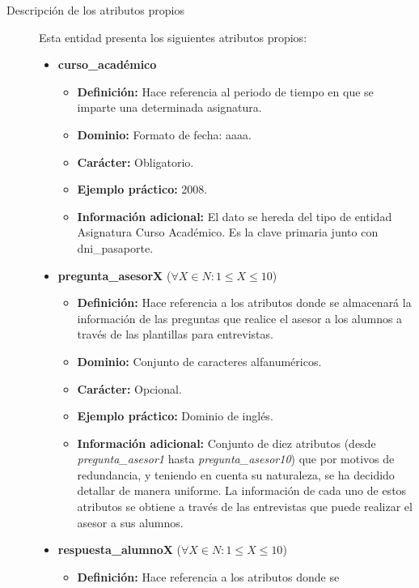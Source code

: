 \begin{description}
   \item[Descripción de los atributos propios] Esta entidad presenta los
   siguientes atributos propios:

   \begin{itemize}
   \item \textbf{curso\_académico}
      \begin{itemize}
         \item \textbf{Definición:} Hace referencia al periodo de tiempo en que se imparte una determinada asignatura.
         \item \textbf{Dominio:} Formato de fecha: aaaa.
         \item \textbf{Carácter:}  Obligatorio.
         \item \textbf{Ejemplo práctico:} 2008.
         \item \textbf{Información adicional:} El dato se hereda del tipo de entidad Asignatura Curso Académico. Es la clave primaria junto con dni\_pasaporte.
      \end{itemize}
   \item \textbf{pregunta\_asesorX} ($\forall X \in N : 1 \leq X \leq 10$)
      \begin{itemize}
         \item \textbf{Definición:} Hace referencia a los atributos donde se
         almacenará la información de las preguntas que realice el asesor
         a los alumnos a través de las plantillas para entrevistas.
         \item \textbf{Dominio:} Conjunto de caracteres alfanuméricos.
         \item \textbf{Carácter:}  Opcional.
         \item \textbf{Ejemplo práctico:} Dominio de inglés.
         \item \textbf{Información adicional:} Conjunto de diez atributos
         (desde \textit{pregunta\_asesor1} hasta \textit{pregunta\_asesor10})
         que por motivos de redundancia, y teniendo en cuenta su naturaleza, se
         ha decidido detallar de manera uniforme. La información de cada uno
         de estos atributos se obtiene a través de las entrevistas que puede
         realizar el asesor a sus alumnos.
      \end{itemize}
   \item \textbf{respuesta\_alumnoX} ($\forall X \in N : 1 \leq X \leq 10$)
      \begin{itemize}
         \item \textbf{Definición:} Hace referencia a los atributos donde se

\end{itemize}
\end{itemize}
\end{description}
